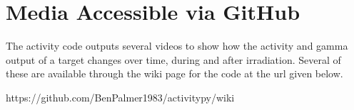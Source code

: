 \FloatBarrier
\section{Media Accessible via GitHub}

The activity code outputs several videos to show how the activity and gamma output of a target changes over time, during and after irradiation.  Several of these are available through the wiki page for the code at the \acrshort{url} given below.

https://github.com/BenPalmer1983/activitypy/wiki














